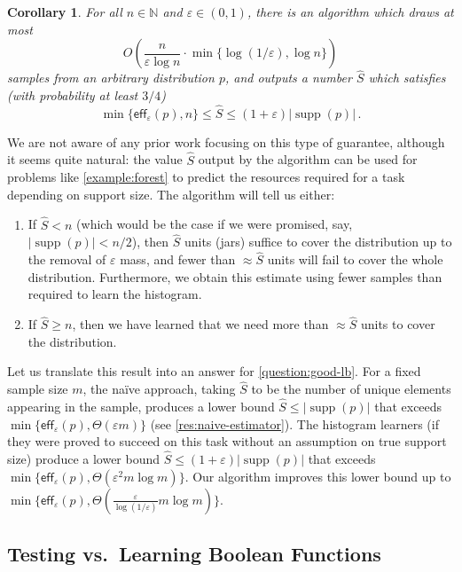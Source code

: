 \documentclass[10pt,a4paper]{article}
\newtheorem{corollary}{Corollary}[section]
\DeclareMathOperator{\supp}{supp}   %
\newcommand{\bN}{\ensuremath{\mathbb{N}}}
\newcommand{\eff}{\mathsf{eff}}
\renewcommand{\epsilon}{\varepsilon}
\begin{document}
\begin{corollary}
\label{res:intro-good-lb}
For all $n \in \bN$ and $\epsilon \in (0,1)$, there is an algorithm which draws at most
\[
  O\left(\frac{n}{\epsilon \log n} \cdot \min\{ \log(1/\epsilon), \log n \} \right)
\]
samples from an arbitrary distribution $p$, and outputs a number $\widehat S$ which satisfies (with
probability at least $3/4$)
\[
  \min\{ \eff_\epsilon(p), n \} \leq \widehat S \leq (1+\epsilon) |\supp(p)| \,.
\]
\end{corollary}
\noindent
We are not aware of any prior work focusing on this type of guarantee, although it seems
quite natural: the value $\widehat S$ output by the algorithm can be used for problems like
\cref{example:forest} to predict the resources required for a task depending on support size. The
algorithm will tell us either:
\begin{enumerate}[itemsep=0pt]
\item If $\widehat S < n$ (which would be the case if we were promised, say, $|\supp(p)| < n/2$),
then $\widehat S$ units (jars) suffice to cover the distribution up to the removal of $\epsilon$
mass, and fewer than $\approx \widehat S$ units will fail to cover the whole distribution.
Furthermore, we obtain this estimate using fewer samples than required to learn the histogram.
\item If $\widehat S \geq n$, then we have learned that we need more than $\approx \widehat S$ units
to cover the distribution.
\end{enumerate}
Let us translate this result into an answer for \cref{question:good-lb}. For a fixed sample size
$m$, the na\"ive approach, taking $\widehat S$ to be the number of unique elements appearing in the
sample, produces a lower bound $\widehat S \leq |\supp(p)|$ that exceeds $\min\{\eff_\epsilon(p),
\Theta(\epsilon m)\}$ (see \cref{res:naive-estimator}). The histogram learners (if they were proved
to succeed on this task without an assumption on true support size) produce a lower bound $\widehat
S \leq (1+\epsilon)|\supp(p)|$ that exceeds $\min\{\eff_\epsilon(p), \Theta(\epsilon^2 m \log m)\}$.
Our algorithm improves this lower bound up to $\min\{\eff_\epsilon(p),
\Theta(\tfrac{\epsilon}{\log(1/\epsilon)} m \log m)\}$.  

\subsection{Testing \texorpdfstring{vs.~Learning Boolean Functions}{vs. Learning Boolean Functions}}
\end{document}
